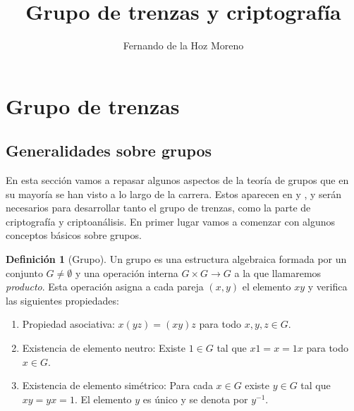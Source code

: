 \documentclass[12pt]{article}
\title{Grupo de trenzas y criptografía}
\author{Fernando de la Hoz Moreno}
\date{}
\theoremstyle{definition}
\newtheorem{defi}{Definición}[section]
\begin{document}
\maketitle
\newpage
\tableofcontents
\newpage
\section{Grupo de trenzas}
\subsection{Generalidades sobre grupos}
\label{sec:grupos}
En esta sección vamos a repasar algunos aspectos de la teoría de grupos que en su mayoría se han visto a lo largo de la carrera. Estos aparecen en \cite{group} y \cite{br_gr}, y serán necesarios para desarrollar tanto el grupo de trenzas, como la parte de criptografía y criptoanálisis. En primer lugar vamos a comenzar con algunos conceptos básicos sobre grupos.

\begin{defi}[Grupo]
Un grupo es una estructura algebraica formada por un conjunto $G\neq\emptyset$ y una operación interna $G\times G\rightarrow G$ a la que llamaremos \textit{producto}. Esta operación asigna a cada pareja $(x,y)$ el elemento $xy$ y verifica las siguientes propiedades:

\begin{enumerate}
\item Propiedad asociativa: $x(yz) = (xy)z$ para todo $x,y,z\in G$.
\item Existencia de elemento neutro: Existe $1\in G$ tal que $x1= x = 1x$ para todo $ x\in G$.
\item Existencia de elemento simétrico: Para cada $x \in G$ existe $y\in G$ tal que $xy=yx = 1$. El elemento $y$ es único y se denota por $y^{-1}$.
\end{enumerate}
\end{defi}
\end{document}

